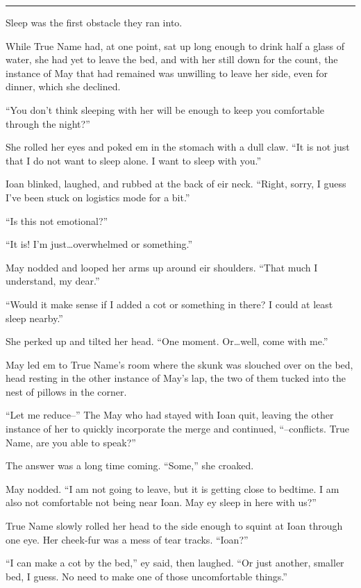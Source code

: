\begin{center}\rule{0.5\linewidth}{0.5pt}\end{center}

Sleep was the first obstacle they ran into.

While True Name had, at one point, sat up long enough to drink half a glass of water, she had yet to leave the bed, and with her still down for the count, the instance of May that had remained was unwilling to leave her side, even for dinner, which she declined.

``You don't think sleeping with her will be enough to keep you comfortable through the night?''

She rolled her eyes and poked em in the stomach with a dull claw. ``It is not just that I do not want to sleep alone. I want to sleep with you.''

Ioan blinked, laughed, and rubbed at the back of eir neck. ``Right, sorry, I guess I've been stuck on logistics mode for a bit.''

``Is this not emotional?''

``It is! I'm just\ldots overwhelmed or something.''

May nodded and looped her arms up around eir shoulders. ``That much I understand, my dear.''

``Would it make sense if I added a cot or something in there? I could at least sleep nearby.''

She perked up and tilted her head. ``One moment. Or\ldots well, come with me.''

May led em to True Name's room where the skunk was slouched over on the bed, head resting in the other instance of May's lap, the two of them tucked into the nest of pillows in the corner.

``Let me reduce--'' The May who had stayed with Ioan quit, leaving the other instance of her to quickly incorporate the merge and continued, ``--conflicts. True Name, are you able to speak?''

The answer was a long time coming. ``Some,'' she croaked.

May nodded. ``I am not going to leave, but it is getting close to bedtime. I am also not comfortable not being near Ioan. May ey sleep in here with us?''

True Name slowly rolled her head to the side enough to squint at Ioan through one eye. Her cheek-fur was a mess of tear tracks. ``Ioan?''

``I can make a cot by the bed,'' ey said, then laughed. ``Or just another, smaller bed, I guess. No need to make one of those uncomfortable things.''

